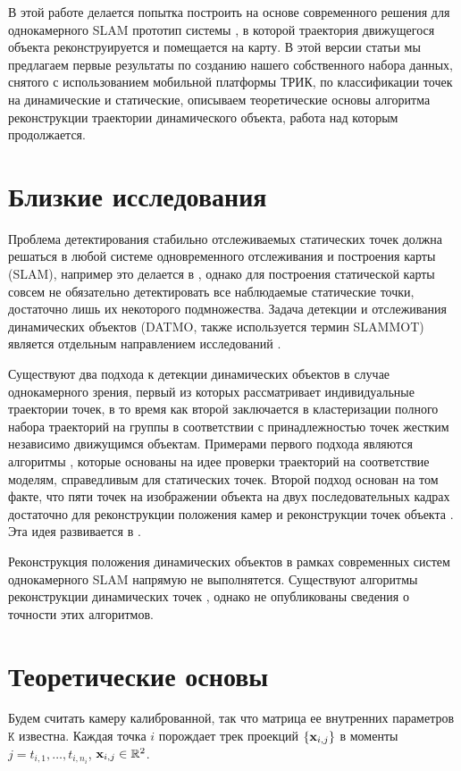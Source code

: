 \documentclass[conference]{IEEEtran}
\begin{document}
В этой работе делается попытка построить на основе современного решения для однокамерного SLAM \cite{mur2014orb} прототип системы , в которой траектория движущегося объекта реконструируется и помещается на карту. В этой версии статьи мы предлагаем первые результаты по созданию нашего собственного набора данных, снятого с использованием мобильной платформы ТРИК, по классификации точек на динамические и статические, описываем теоретические основы алгоритма реконструкции траектории динамического объекта, работа над которым продолжается.

\section{Близкие исследования}
Проблема детектирования стабильно отслеживаемых статических точек должна решаться в любой системе одновременного отслеживания и построения карты (SLAM), например это делается в \cite{mur2014orb}, однако для построения статической карты совсем не обязательно детектировать все наблюдаемые статические точки, достаточно лишь их некоторого подмножества. Задача детекции и отслеживания динамических объектов (DATMO, также используется термин SLAMMOT) является отдельным направлением исследований \cite{azim2012detection,migliore2009use,hsiao2011achieving}. 

Существуют два подхода к детекции динамических объектов в случае однокамерного зрения, первый из которых рассматривает индивидуальные траектории точек, в то время как второй заключается в кластеризации полного набора траекторий на группы в соответствии с принадлежностью точек жестким независимо движущимся объектам. Примерами первого подхода являются алгоритмы \cite{migliore2009use,hsiao2011achieving}, которые основаны на идее проверки траекторий на соответствие моделям, справедливым для статических точек. Второй подход основан на том факте, что пяти точек на изображении объекта на двух последовательных кадрах достаточно для реконструкции положения камер и  реконструкции точек объекта \cite{Ziss}. Эта идея развивается в \cite{ozden2004reconstructing,vidal2003optimal}.

Реконструкция положения динамических объектов в рамках современных систем однокамерного SLAM напрямую не выполнятется. Существуют алгоритмы реконструкции динамических точек \cite{migliore2009use,hsiao2011achieving}, однако не опубликованы сведения о точности этих алгоритмов.

\section{Теоретические основы}
Будем считать камеру калиброванной, так что матрица ее внутренних параметров $\mathtt{K}$ известна. Каждая точка $i$ порождает трек проекций $\{ {\bf x}_{i,j} \}$ в моменты $j = t_{i,1}, \ldots, t_{i,n_i}$, ${\bf x}_{i,j} \in \mathbb{R}^2$. 
\end{document}
